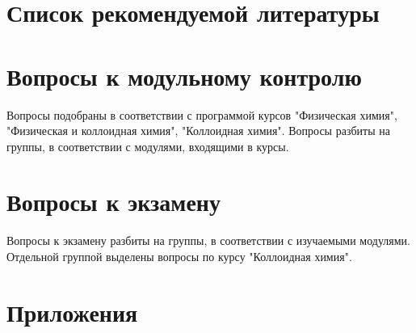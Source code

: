 \documentclass[12pt,a4paper]{report}
\begin{document}
\chapter*{Список рекомендуемой литературы}


\chapter{Вопросы к  модульному контролю}
Вопросы подобраны в соответствии с программой курсов "Физическая химия", "Физическая и коллоидная химия", "Коллоидная химия". Вопросы разбиты на группы, в соответствии с модулями, входящими в курсы.




\newpage
\chapter{Вопросы к  экзамену}
Вопросы к экзамену разбиты на группы, в соответствии с изучаемыми модулями. Отдельной группой выделены вопросы по курсу "Коллоидная химия".

\newpage

\newpage
\chapter{Приложения}


\newpage

\newpage

\end{document}
